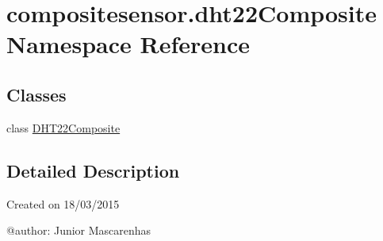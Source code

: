 \hypertarget{namespacecompositesensor_1_1dht22Composite}{}\section{compositesensor.\+dht22\+Composite Namespace Reference}
\label{namespacecompositesensor_1_1dht22Composite}
\subsection*{Classes}
\begin{DoxyCompactItemize}
\item 
class \hyperlink{classcompositesensor_1_1dht22Composite_1_1DHT22Composite}{D\+H\+T22\+Composite}
\end{DoxyCompactItemize}


\subsection{Detailed Description}
\begin{DoxyVerb}Created on 18/03/2015

@author: Junior Mascarenhas
\end{DoxyVerb}
 